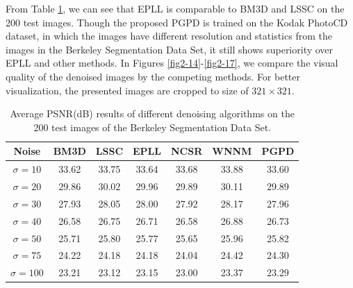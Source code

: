 From Table \ref{tab2-6}, we can see that EPLL is comparable to BM3D and LSSC on the 200 test images. Though the proposed PGPD is trained on the Kodak PhotoCD dataset, in which the images have different resolution and statistics from the images in the Berkeley Segmentation Data Set, it still shows superiority over EPLL and other methods. In Figures \ref{fig2-14}-\ref{fig2-17}, we compare the visual quality of the denoised images by the competing methods. For better visualization, the presented images are cropped to size of $321\times 321$.
\begin{table}[t!]
\caption{Average PSNR(dB) results of different denoising algorithms on the 200 test images of the Berkeley Segmentation Data Set.}
\label{tab2-6}
\begin{center}
\begin{tabular}{|c||c|c|c|c|c|c|}
\hline
Noise&\textbf{BM3D}&\textbf{LSSC}&\textbf{EPLL}&\textbf{NCSR}&\textbf{WNNM}&\textbf{PGPD}
\\
\hline
\hline
$\sigma=10$&33.62 &33.75&33.64 & 33.68& 33.88 &33.60
\\
\hline
$\sigma=20$& 29.86&30.02& 29.96 &29.89 & 30.11&  29.89 
\\
\hline
$\sigma=30$&27.93 &28.05 &28.00 &27.92 &28.17 &27.96  
\\
\hline
$\sigma=40$&26.58 &26.75&26.71 &26.58 & 26.88 & 26.73 
\\
\hline
$\sigma=50$&25.71 &25.80 &25.77 &25.65 &25.96  & 25.82 
\\
\hline
$\sigma=75$&24.22 &24.18 &24.18 & 24.04 &24.42  & 24.30
\\
\hline
$\sigma=100$&23.21 &23.12 & 23.15 & 23.00 & 23.37 & 23.29
\\
\hline
\end{tabular}
\end{center}
\end{table}


